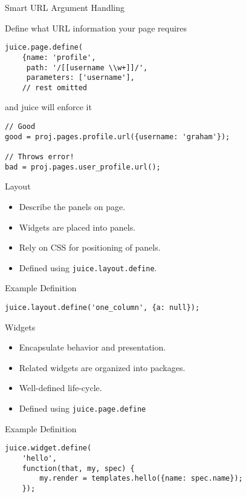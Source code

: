 \documentclass{beamer}
\begin{document}
\begin{frame}[fragile]{Smart URL Argument Handling}

Define what URL information your page requires

\begin{verbatim}
juice.page.define(
    {name: 'profile',
     path: '/[[username \\w+]]/',
     parameters: ['username'],
    // rest omitted
\end{verbatim}

and juice will enforce it

\begin{verbatim}
// Good
good = proj.pages.profile.url({username: 'graham'});

// Throws error!
bad = proj.pages.user_profile.url();
\end{verbatim}

\end{frame}


\begin{frame}{Layout}
  \begin{itemize}
  \item Describe the panels on page.
  \item Widgets are placed into panels.
  \item Rely on CSS for positioning of panels.
  \item Defined using \texttt{juice.layout.define}.
  \end{itemize}
\end{frame}

\begin{frame}[fragile]{Example Definition}
\begin{verbatim}
juice.layout.define('one_column', {a: null});
\end{verbatim}
\end{frame}

\begin{frame}{Widgets}
  \begin{itemize}
  \item Encapsulate behavior and presentation.
  \item Related widgets are organized into packages.
  \item Well-defined life-cycle.
  \item Defined using \texttt{juice.page.define}
  \end{itemize}
\end{frame}

\begin{frame}[fragile]{Example Definition}
\begin{verbatim}
juice.widget.define(
    'hello',
    function(that, my, spec) {
        my.render = templates.hello({name: spec.name});
    });
\end{verbatim}
\end{frame}
\end{document}

